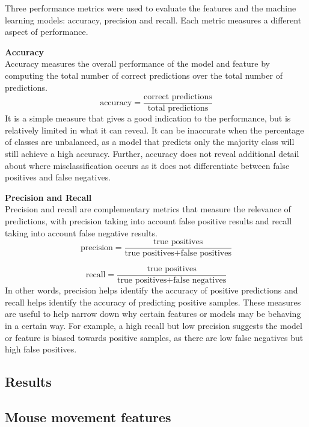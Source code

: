 \documentclass[Report.tex]{subfiles}
\begin{document}
Three performance metrics were used to evaluate the features and the machine learning models: accuracy, precision and recall. Each metric measures a different aspect of performance. 

\textbf{Accuracy} \\
Accuracy measures the overall performance of the model and feature by computing the total number of correct predictions over the total number of predictions.
\begin{equation*}
\text{accuracy} = \frac{\text{correct predictions}}{\text{total predictions}}
\end{equation*}
It is a simple measure that gives a good indication to the performance, but is relatively limited in what it can reveal. It can be inaccurate when the percentage of classes are unbalanced, as a model that predicts only the majority class will still achieve a high accuracy. Further, accuracy does not reveal additional detail about where misclassification occurs as it does not differentiate between false positives and false negatives. 

\textbf{Precision and Recall} \\
Precision and recall are complementary metrics that measure the relevance of predictions, with precision taking into account false positive results and recall taking into account false negative results. 
\begin{equation*}
\text{precision} = \frac{\text{true positives}}{\text{true positives} + \text{false positives}}
\end{equation*}

\begin{equation*}
\text{recall} = \frac{\text{true positives}}{\text{true positives} + \text{false negatives}}
\end{equation*}
In other words, precision helps identify the accuracy of positive predictions and recall helps identify the accuracy of predicting positive samples. These measures are useful to help narrow down why certain features or models may be behaving in a certain way. For example, a high recall but low precision suggests the model or feature is biased towards positive samples, as there are low false negatives but high false positives. 
\subsection{Results}

\subsection{Mouse movement features}\label{sec:mm-features-results}
\end{document}
